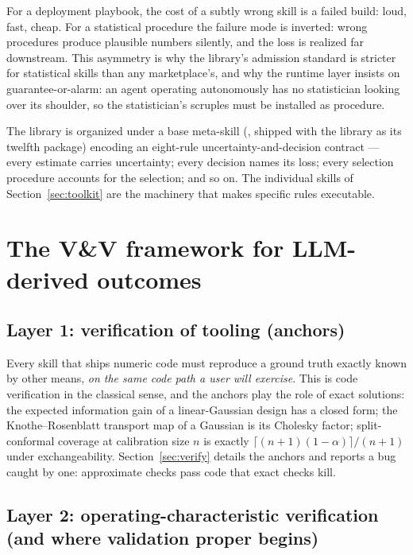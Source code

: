 \documentclass[11pt,a4paper]{article}
\begin{document}
For a deployment playbook, the cost of a subtly wrong skill is a failed
build: loud, fast, cheap. For a statistical procedure the failure mode is
inverted: wrong procedures produce plausible numbers silently, and the loss
is realized far downstream. This asymmetry is why the library's admission
standard is stricter for statistical skills than any marketplace's, and why
the runtime layer insists on guarantee-or-alarm: an agent operating
autonomously has no statistician looking over its shoulder, so the
statistician's scruples must be installed as procedure.

The library is organized under a base meta-skill
(, shipped with the library as its
twelfth package) encoding an eight-rule uncertainty-and-decision contract --- every estimate carries uncertainty;
every decision names its loss; every selection procedure accounts for the
selection; and so on. The individual skills of
Section~\ref{sec:toolkit} are the machinery that makes specific rules
executable.

\section{The V\&V framework for LLM-derived outcomes}\label{sec:framework}

\subsection{Layer 1: verification of tooling (anchors)}

Every skill that ships numeric code must reproduce a ground truth exactly
known by other means, \emph{on the same code path a user will exercise}.
This is code verification in the classical sense, and the anchors play the
role of exact solutions: the expected information gain of a linear-Gaussian
design has a closed form; the Knothe--Rosenblatt transport map of a
Gaussian is its Cholesky factor; split-conformal coverage at calibration
size $n$ is exactly $\lceil (n{+}1)(1{-}\alpha)\rceil/(n{+}1)$ under
exchangeability. Section~\ref{sec:verify} details the anchors and reports a
bug caught by one: approximate checks pass code that exact checks kill.

\subsection{Layer 2: operating-characteristic verification (and where
validation proper begins)}
\end{document}
